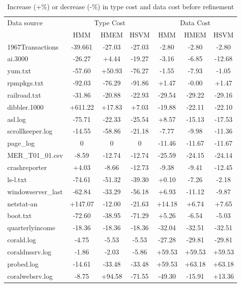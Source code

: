 \begin{table}[th]
\begin{center}
\begin{tabular}{|l||c|c|c||c|c|c|}\hline
Data source & \multicolumn{3}{|c||}{Type Cost} & \multicolumn{3}{|c|}{Data Cost}\\ \cline{2-7} 
& HMM & HMEM & HSVM & HMM & HMEM & HSVM \\ \hline 
1967Transactions & -39.661 & -27.03 & -27.03 & -2.80 & -2.80 & -2.80  \\ \hline
ai.3000 & -26.27 & +4.44 & -19.27 & -3.16 & -6.85 & -12.68            \\ \hline
yum.txt & -57.60 & +50.93 & -76.27 & -1.55 & -7.93 & -1.05            \\ \hline
rpmpkgs.txt & -92.03 & -76.29 & -91.86 & +1.47 & -0.00 & +1.47        \\ \hline
railroad.txt & -31.86 & -20.88 & -22.93 & -29.54 & -29.22 & -29.16    \\ \hline
dibbler.1000 & +611.22 & +17.83 & +7.03 & -19.88 & -22.11 & -22.10    \\ \hline
asl.log & -75.71 & -22.33 & -25.54 & +8.57 & -15.13 & -17.53          \\ \hline
scrollkeeper.log & -14.55 & -58.86 & -21.18 & -7.77 & -9.98 & -11.36  \\ \hline
page\_log & 0 & 0 & 0 & -11.46 & -11.67 & -11.67                      \\ \hline
MER\_T01\_01.csv & -8.59 & -12.74 & -12.74 & -25.59 & -24.15 & -24.14 \\ \hline
crashreporter & +4.03 & -8.66 & -12.73 & -9.38 & -9.41 & -12.45       \\ \hline
ls-l.txt & -74.61 & -51.32 & -39.30 & +0.10 & -7.26 & -2.18           \\ \hline
windowserver\_last & -62.84 & -33.29 & -56.18 & +6.93 & -11.12 & -9.87 \\ \hline
netstat-an & +147.07 & -12.00 & -21.63 & +14.18 & +6.74 & +7.65       \\ \hline
boot.txt & -72.60 & -38.95 & -71.29 & +5.26 & -6.54 & -5.03           \\ \hline
quarterlyincome & -18.36 & -18.36 & -18.36 & -32.04 & -32.51 & -32.51 \\ \hline
corald.log & -4.75 & -5.53 & -5.53 & -27.28 & -29.81 & -29.81         \\ \hline
coraldnssrv.log  & -1.86 & -2.03 & -5.86 & +59.53 & +59.53 & +59.53   \\ \hline
probed.log & -14.61 & -33.48 & -33.48 & +59.53 & +63.18 & +63.18      \\ \hline
coralwebsrv.log & -8.75 & +94.58 & -71.55 & -49.30 & -15.91 & +13.36  \\ \hline
\end{tabular}
\sk
\caption{Increase (+\%) or decrease (-\%) in type cost and data
cost before refinement} \label{tab:complexity1} \shrink
\end{center}
\end{table}

